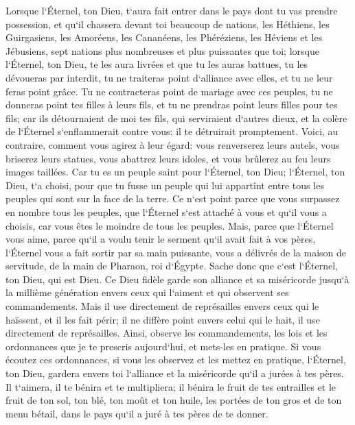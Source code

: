 \verse Lorsque l`Éternel, ton Dieu, t`aura fait entrer dans le pays dont tu vas prendre possession, et qu`il chassera devant toi beaucoup de nations, les Héthiens, les Guirgasiens, les Amoréens, les Cananéens, les Phéréziens, les Héviens et les Jébusiens, sept nations plus nombreuses et plus puissantes que toi; 
\verse lorsque l`Éternel, ton Dieu, te les aura livrées et que tu les auras battues, tu les dévoueras par interdit, tu ne traiteras point d`alliance avec elles, et tu ne leur feras point grâce. 
\verse Tu ne contracteras point de mariage avec ces peuples, tu ne donneras point tes filles à leurs fils, et tu ne prendras point leurs filles pour tes fils; 
\verse car ils détournaient de moi tes fils, qui serviraient d`autres dieux, et la colère de l`Éternel s`enflammerait contre vous: il te détruirait promptement. 
\verse Voici, au contraire, comment vous agirez à leur égard: vous renverserez leurs autels, vous briserez leurs statues, vous abattrez leurs idoles, et vous brûlerez au feu leurs images taillées. 
\verse Car tu es un peuple saint pour l`Éternel, ton Dieu; l`Éternel, ton Dieu, t`a choisi, pour que tu fusse un peuple qui lui appartînt entre tous les peuples qui sont sur la face de la terre. 
\verse Ce n`est point parce que vous surpassez en nombre tous les peuples, que l`Éternel s`est attaché à vous et qu`il vous a choisis, car vous êtes le moindre de tous les peuples. 
\verse Mais, parce que l`Éternel vous aime, parce qu`il a voulu tenir le serment qu`il avait fait à vos pères, l`Éternel vous a fait sortir par sa main puissante, vous a délivrés de la maison de servitude, de la main de Pharaon, roi d`Égypte. 
\verse Sache donc que c`est l`Éternel, ton Dieu, qui est Dieu. Ce Dieu fidèle garde son alliance et sa miséricorde jusqu`à la millième génération envers ceux qui l`aiment et qui observent ses commandements. 
\verse Mais il use directement de représailles envers ceux qui le haïssent, et il les fait périr; il ne diffère point envers celui qui le hait, il use directement de représailles. 
\verse Ainsi, observe les commandements, les lois et les ordonnances que je te prescris aujourd`hui, et mets-les en pratique. 
\verse Si vous écoutez ces ordonnances, si vous les observez et les mettez en pratique, l`Éternel, ton Dieu, gardera envers toi l`alliance et la miséricorde qu`il a jurées à tes pères. 
\verse Il t`aimera, il te bénira et te multipliera; il bénira le fruit de tes entrailles et le fruit de ton sol, ton blé, ton moût et ton huile, les portées de ton gros et de ton menu bétail, dans le pays qu`il a juré à tes pères de te donner. 
